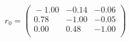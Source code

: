 \documentclass[10pt,a4paper]{article}
\begin{document}
 \begin{equation*} r_0  =  %
\begin{pmatrix}{}
  -1.00 & -0.14 & -0.06 \\ 
  0.78 & -1.00 & -0.05 \\ 
  0.00 & 0.48 & -1.00 \\ 
  \end{pmatrix}
 \end{equation*} 
\end{document}
